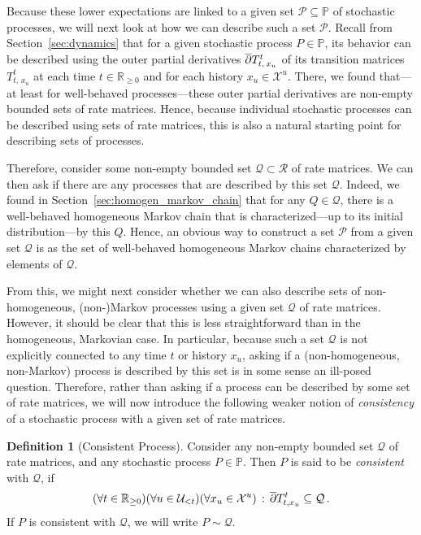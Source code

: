\documentclass[10pt,a4paper]{paper}
\theoremstyle{definition}
\newtheorem{definition}{Definition}
\newcommand{\reals}{\mathbb{R}}
\newcommand{\realsnonneg}{\reals_{\geq 0}}
\newcommand{\states}{\mathcal{X}}
\newcommand{\processes}{\mathbb{P}}
\newcommand{\rateset}{\mathcal{Q}}
\begin{document}
Because these lower expectations are linked to a given set $\mathcal{P}\subseteq\processes$ of stochastic processes, we will next look at how we can describe such a set $\mathcal{P}$.
Recall from Section~\ref{sec:dynamics} that for a given stochastic process $P\in\processes$, its behavior can be described using the outer partial derivatives $\smash{\overline{\partial}}T_{t,\,x_u}^t$ of its transition matrices $T_{t,\,x_u}^t$ at each time $t\in\realsnonneg$ and for each history $x_u\in\states^u$. There, we found that---at least for well-behaved processes---these outer partial derivatives are non-empty bounded sets of rate matrices. Hence, because individual stochastic processes can be described using sets of rate matrices, this is also a natural starting point for describing sets of processes.

Therefore, consider some non-empty bounded set $\rateset\subset\mathcal{R}$ of rate matrices. We can then ask if there are any processes that are described by this set $\rateset$. Indeed, we found in Section~\ref{sec:homogen_markov_chain} that for any $Q\in\rateset$, there is a well-behaved homogeneous Markov chain that is characterized---up to its initial distribution---by this $Q$. Hence, an obvious way to construct a set $\mathcal{P}$ from a given set $\rateset$ is as the set of well-behaved homogeneous Markov chains characterized by elements of $\rateset$.

From this, we might next consider whether we can also describe sets of non-homogeneous, (non-)Markov processes using a given set $\rateset$ of rate matrices. However, it should be clear that this is less straightforward than in the homogeneous, Markovian case. In particular, because such a set $\rateset$ is not explicitly connected to any time $t$ or history $x_u$, asking if a (non-homogeneous, non-Markov) process is described by this set is in some sense an ill-posed question.
Therefore, rather than asking if a process can be described by some set of rate matrices, we will now introduce the following weaker notion of \emph{consistency} of a stochastic process with a given set of rate matrices.

\begin{definition}[Consistent Process]\label{def:consistent_process}
Consider any non-empty bounded set $\rateset$ of rate matrices, and any stochastic process $P\in\processes$. Then $P$ is said to be \emph{consistent} with $\rateset$, if
\begin{equation*}
(\forall t\in\realsnonneg)(\forall u\in\mathcal{U}_{<t})(\forall x_u\in\states^u)\,:\, \smash{\overline{\partial}}T_{t,x_u}^t \subseteq \rateset\,.
\end{equation*}
If $P$ is consistent with $\rateset$, we will write $P\sim\rateset$.
\end{definition}
\end{document}
